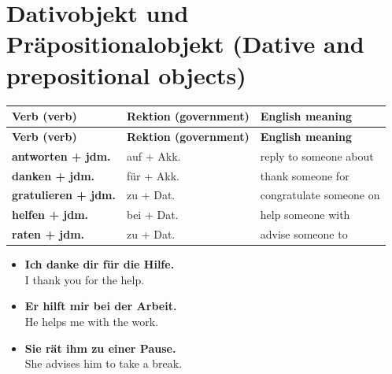 \documentclass[a4paper,11pt]{article}
\newcommand{\ExampleItem}[2]{\item \textbf{#1}\\{\small\color{SoftGray}#2}}
\begin{document}
\section{Dativobjekt und Präpositionalobjekt (Dative and prepositional objects)}
\begin{longtable}{>{\raggedright\arraybackslash}p{} >{\raggedright\arraybackslash}p{} >{\raggedright\arraybackslash}p{}}
\rowcolor{HeaderBlueDark}
\color{white}\textbf{Verb (verb)} & \color{white}\textbf{Rektion (government)} & \color{white}\textbf{English meaning}\\
\endfirsthead
\rowcolor{HeaderBlueDark}
\color{white}\textbf{Verb (verb)} & \color{white}\textbf{Rektion (government)} & \color{white}\textbf{English meaning}\\
\endhead
\textbf{antworten + jdm.} & auf + Akk. & reply to someone about\\
\textbf{danken + jdm.} & für + Akk. & thank someone for\\
\textbf{gratulieren + jdm.} & zu + Dat. & congratulate someone on\\
\textbf{helfen + jdm.} & bei + Dat. & help someone with\\
\textbf{raten + jdm.} & zu + Dat. & advise someone to\\
\end{longtable}
\begin{exbox}
\begin{itemize}
\ExampleItem{Ich danke dir für die Hilfe.}{I thank you for the help.}
\ExampleItem{Er hilft mir bei der Arbeit.}{He helps me with the work.}
\ExampleItem{Sie rät ihm zu einer Pause.}{She advises him to take a break.}
\end{itemize}
\end{exbox}
\end{document}
